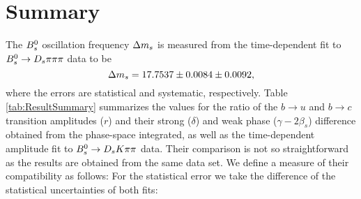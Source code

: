 \section{Summary}
\label{sec:Summary}


The ${{B}^0_{s}}$ oscillation frequency ${\Delta m_{{s}}}$ is measured from the time-dependent fit to ${{B}^0_{s}}\rightarrow{\ensuremath{{D}_{s}}}{\ensuremath{\pi}}{\ensuremath{\pi}}{\ensuremath{\pi}}$ data to be
\begin{equation*}
{\ensuremath{\Delta m_{{s}}}} = 17.7537 \pm 0.0084 \pm 0.0092,  
\end{equation*}
where the errors are statistical and systematic, respectively.
Table \ref{tab:ResultSummary} summarizes the values for the ratio of the $b\to u$ and $b\to c$ transition amplitudes ($r$)
and their strong ($\delta$) and weak phase ($\gamma -2 \beta_s$) difference 
obtained from the phase-space integrated, as well as the time-dependent amplitude fit to ${{B}^0_{s}}\rightarrow{\ensuremath{{D}_{s}}}{\ensuremath{K}}{\ensuremath{\pi}}{\ensuremath{\pi}}$ data.
%
Their comparison is not so straightforward as the results are obtained from the same data set. 
We define a measure of their compatibility as follows:
For the statistical error we take the difference of the statistical uncertainties of both fits:
